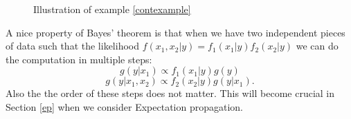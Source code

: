 \documentclass[12pt,vu]{adammath}
\theoremstyle{plain}
\theoremstyle{definition}
\theoremstyle{remark}
\begin{document}
\begin{figure}[h]\label{fig:contexample}
  \centering
  \caption{Illustration of example \ref{contexample}}
\end{figure}

A nice property of Bayes' theorem is that when we have two independent pieces of data such that the likelihood $f(x_1, x_2 | y) = f_1(x_1 | y) f_2(x_2 | y)$ we can do the computation in multiple steps:
$$ g(y | x_1) \propto f_1(x_1 | y) g(y) $$
$$ g(y | x_1, x_2) \propto f_2(x_2 | y) g(y | x_1).$$
Also the the order of these steps does not matter.
This will become crucial in Section \ref{ep} when we consider Expectation propagation.
\end{document}
